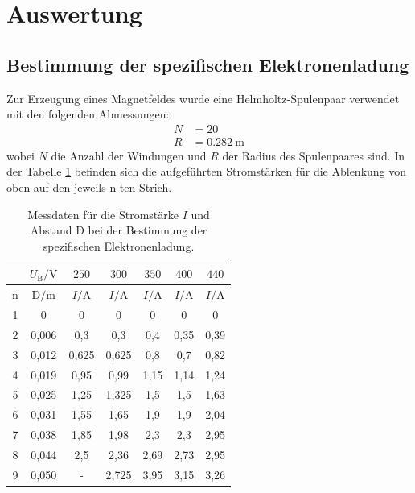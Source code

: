 \section{Auswertung}
\label{sec:Auswertung}

\subsection{Bestimmung der spezifischen Elektronenladung}
Zur Erzeugung eines Magnetfeldes wurde eine Helmholtz-Spulenpaar verwendet mit den folgenden Abmessungen:
\begin{align*}
N &= 20 \\
R &= \SI{0,282}{\meter}
\end{align*}
wobei $N$ die Anzahl der Windungen und $R$ der Radius des Spulenpaares sind. In der Tabelle \ref{tab:Elladung} befinden sich die aufgeführten Stromstärken für die Ablenkung von oben auf den jeweils n-ten Strich. 

\begin{table}[htbp]
	\centering
	\caption{Messdaten für die Stromstärke $I$ und Abstand $\text{D}$ bei der Bestimmung der spezifischen Elektronenladung.}
	\label{tab:Elladung}
	\begin{tabular}{c c c c c c c}
		\toprule
		& $U_{\text{B}} / \si{\volt} $ & $250$ & $300$ & $350$ & $400$ & $440$ \\
		\midrule
		n & $\text{D} / \si{\m}$ & $I / \si{\ampere} $ & $I / \si{\ampere} $ & $I / \si{\ampere} $ & $I / \si{\ampere} $ & $I / \si{\ampere} $ \\
		\midrule
		1 &	0 &	0 & 0 & 0 &	0 & 0 \\
		2 &	0,006 &	0,3 &	0,3 &	0,4	 & 0,35 &	0,39 \\
		3 &	0,012 &	0,625&	0,625 &	0,8	 & 0,7  &	0,82 \\
		4 &	0,019 &	0,95 &	0,99 &	1,15 & 1,14 &	1,24 \\
		5 &	0,025 &	1,25 &	1,325&	1,5	 & 1,5	&   1,63 \\
		6 &	0,031 &	1,55 &	1,65 &	1,9	 & 1,9	&   2,04 \\
		7 &	0,038 &	1,85 &	1,98 &	2,3	 & 2,3	&   2,95 \\
		8 &	0,044 &	2,5  &  2,36 &  2,69 & 2,73	&   2,95 \\
		9 &	0,050 & -    &  2,725 &	3,95 & 3,15 &	3,26 \\
		\bottomrule
	\end{tabular}
\end{table}

